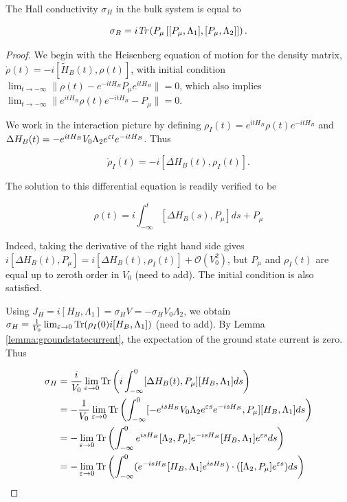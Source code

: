 \documentclass[12pt, letterpaper]{article}
\begin{document}
\begin{proposition}

The Hall conductivity $\sigma_H$ in the bulk system is equal to 

\[\sigma_B = i\emph{Tr}\left(P_\mu \left[[P_\mu,\Lambda_1],[P_\mu,\Lambda_2]\right]\right).\]
\end{proposition}
\begin{proof}
We begin with the Heisenberg equation of motion for the density matrix, $\dot{\rho}(t) = - i[\widetilde{H}_B(t),\rho(t)]$, with initial condition $\lim_{t\to-\infty} \|\rho(t) - e^{-itH_B}P_\mu e^{itH_B}\| = 0$, which also implies $\lim_{t\to-\infty} \|e^{itH_B}\rho(t)e^{-itH_B} - P_\mu\| = 0$.

We work in the interaction picture by defining $\rho_I(t) = e^{itH_B}\rho(t)e^{-itH_B}$ and $\Delta H_B(t) = -e^{itH_B}V_0\Lambda_2 e^{\varepsilon t}e^{-itH_B}$. Thus

\[\dot{\rho}_I(t) = -i[\Delta H_B(t), \rho_I(t)].\]

The solution to this differential equation is readily verified to be

\[\rho(t) = i\int_{-\infty}^t [\Delta H_B(s), P_\mu]ds + P_\mu \]

Indeed, taking the derivative of the right hand side gives $i[\Delta H_B(t), P_\mu] = i[\Delta H_B(t), \rho_I(t)] + \mathcal{O}(V_0^2)$, but $P_\mu$ and $\rho_I(t)$ are equal up to zeroth order in $V_0$ (need to add). The initial condition is also satisfied. 

Using $J_H = i[H_B,\Lambda_1] = \sigma_H V = -\sigma_H V_0\Lambda_2$, we obtain $\sigma_H = \frac{1}{V_0} \lim_{\varepsilon\to 0} \text{Tr}(\rho_I(0)i[H_B,\Lambda_1])$ (need to add). By Lemma \ref{lemma:groundstatecurrent}, the expectation of the ground state current is zero. Thus

\[\begin{aligned}
\sigma_H &= \frac{i}{V_0} \lim_{\varepsilon\to 0}\text{Tr} \left( i\int_{-\infty}^0 [\Delta H_B(t), P_\mu] [H_B,\Lambda_1] ds\right)\\
&= -\frac{1}{V_0} \lim_{\varepsilon\to 0}\text{Tr} \left( \int_{-\infty}^0 [-e^{isH_B}V_0\Lambda_2 e^{\varepsilon s}e^{-isH_B}, P_\mu] [H_B,\Lambda_1] ds\right)\\
&= -\lim_{\varepsilon\to 0}\text{Tr} \left( \int_{-\infty}^0 e^{isH_B}[\Lambda_2, P_\mu]e^{-isH_B}[H_B,\Lambda_1] e^{\varepsilon s}ds\right)\\
&= -\lim_{\varepsilon\to 0}\text{Tr} \left( \int_{-\infty}^0 (e^{-isH_B}[H_B,\Lambda_1]e^{isH_B})\cdot([\Lambda_2, P_\mu] e^{\varepsilon s})ds\right)\\
\end{aligned}\]


\end{proof}
\end{document}
